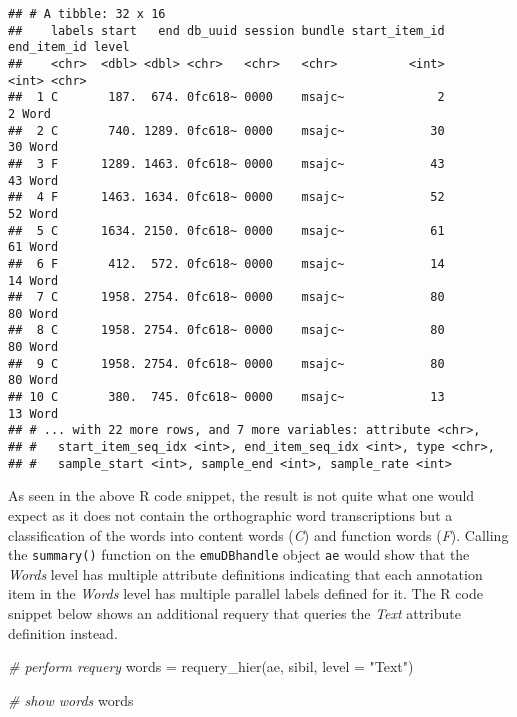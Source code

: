 \documentclass[
]{book}
\newenvironment{Shaded}{\begin{snugshade}}{\end{snugshade}}
\newcommand{\AttributeTok}[1]{\textcolor[rgb]{0.77,0.63,0.00}{#1}}
\newcommand{\CommentTok}[1]{\textcolor[rgb]{0.56,0.35,0.01}{\textit{#1}}}
\newcommand{\FunctionTok}[1]{\textcolor[rgb]{0.00,0.00,0.00}{#1}}
\newcommand{\NormalTok}[1]{#1}
\newcommand{\OtherTok}[1]{\textcolor[rgb]{0.56,0.35,0.01}{#1}}
\newcommand{\StringTok}[1]{\textcolor[rgb]{0.31,0.60,0.02}{#1}}
\begin{document}
\begin{verbatim}
## # A tibble: 32 x 16
##    labels start   end db_uuid session bundle start_item_id end_item_id level
##    <chr>  <dbl> <dbl> <chr>   <chr>   <chr>          <int>       <int> <chr>
##  1 C       187.  674. 0fc618~ 0000    msajc~             2           2 Word 
##  2 C       740. 1289. 0fc618~ 0000    msajc~            30          30 Word 
##  3 F      1289. 1463. 0fc618~ 0000    msajc~            43          43 Word 
##  4 F      1463. 1634. 0fc618~ 0000    msajc~            52          52 Word 
##  5 C      1634. 2150. 0fc618~ 0000    msajc~            61          61 Word 
##  6 F       412.  572. 0fc618~ 0000    msajc~            14          14 Word 
##  7 C      1958. 2754. 0fc618~ 0000    msajc~            80          80 Word 
##  8 C      1958. 2754. 0fc618~ 0000    msajc~            80          80 Word 
##  9 C      1958. 2754. 0fc618~ 0000    msajc~            80          80 Word 
## 10 C       380.  745. 0fc618~ 0000    msajc~            13          13 Word 
## # ... with 22 more rows, and 7 more variables: attribute <chr>,
## #   start_item_seq_idx <int>, end_item_seq_idx <int>, type <chr>,
## #   sample_start <int>, sample_end <int>, sample_rate <int>
\end{verbatim}

As seen in the above R code snippet, the result is not quite what one would expect as it does not contain the orthographic word transcriptions but a classification of the words into content words (\emph{C}) and function words (\emph{F}). Calling the \texttt{summary()} function on the \texttt{emuDBhandle} object \texttt{ae} would show that the \emph{Words} level has multiple attribute definitions indicating that each annotation item in the \emph{Words} level has multiple parallel labels defined for it. The R code snippet below shows an additional requery that queries the \emph{Text} attribute definition instead.

\begin{Shaded}
\begin{Highlighting}[]
\CommentTok{\# perform requery}
\NormalTok{words }\OtherTok{=} \FunctionTok{requery\_hier}\NormalTok{(ae, sibil, }\AttributeTok{level =} \StringTok{"Text"}\NormalTok{)}

\CommentTok{\# show words}
\NormalTok{words}
\end{Highlighting}
\end{Shaded}
\end{document}
